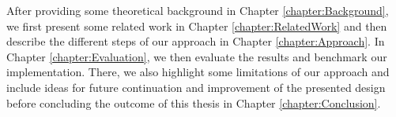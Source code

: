 After providing some theoretical background in Chapter \ref{chapter:Background}, we first present some related work in Chapter \ref{chapter:RelatedWork} and then describe the different steps of our approach in Chapter \ref{chapter:Approach}.
In Chapter \ref{chapter:Evaluation}, we then evaluate the results and benchmark our implementation. There, we also highlight some limitations of our approach and include ideas for future continuation and improvement of the presented design before concluding the outcome of this thesis in Chapter \ref{chapter:Conclusion}.

